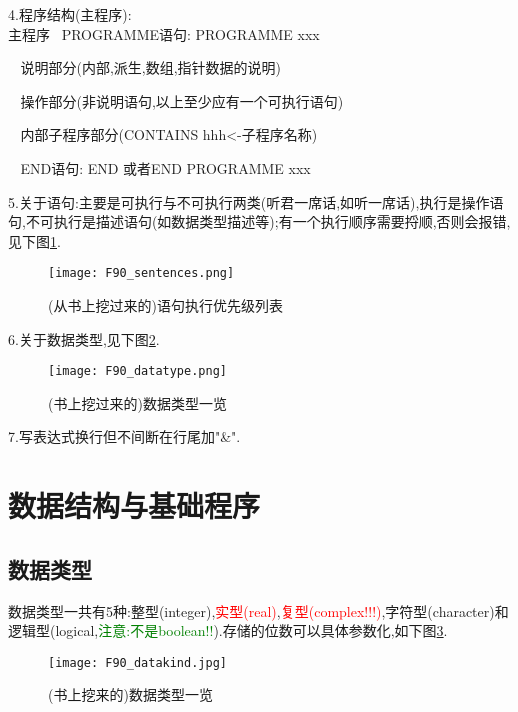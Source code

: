 \noindent
4.程序结构(主程序):\\
	主程序	$\,$ PROGRAMME语句: PROGRAMME xxx \par
		 $\;\;$ 说明部分(内部,派生,数组,指针数据的说明) \par
		 $\;\;$ 操作部分(非说明语句,以上至少应有一个可执行语句) \par
		 $\;\;$ 内部子程序部分(CONTAINS hhh<-子程序名称) \par
		 $\;\;$ END语句: END 或者END PROGRAMME xxx


\noindent
5.关于语句:主要是可执行与不可执行两类(听君一席话,如听一席话),执行是操作语句,不可执行是描述语句(如数据类型描述等);有一个执行顺序需要捋顺,否则会报错,见下图\ref{F90-sentences}.

\begin{figure}[h]
	\noindent
	\centering
	\texttt{[image: F90\_sentences.png]}
	\caption{(从书上挖过来的)语句执行优先级列表}
	\label{F90-sentences}
\end{figure}


\noindent
6.关于数据类型,见下图\ref{F90-datatype}.

\begin{figure}[h]
	\noindent
	\centering
	\texttt{[image: F90\_datatype.png]}
		\caption{(书上挖过来的)数据类型一览}
		\label{F90-datatype}
\end{figure}

\par

7.写表达式换行但不间断在行尾加"\&".

\section{数据结构与基础程序}

\subsection{数据类型}
数据类型一共有5种:整型(integer),\textcolor{red}{实型(real)},\textcolor{red}{复型(complex!!!)},字符型(character)和逻辑型(logical,\textcolor{green}{注意:不是boolean!!}).存储的位数可以具体参数化,如下图\ref{F90-datakind}.

\begin{figure}[h]
	\noindent
	\centering
	\texttt{[image: F90\_datakind.jpg]}
	\caption{(书上挖来的)数据类型一览}
	\label{F90-datakind}
\end{figure}

